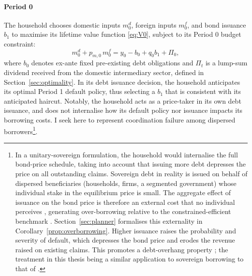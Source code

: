 \documentclass[11pt]{article}
\theoremstyle{definition}
\theoremstyle{plain}
\theoremstyle{remark}
\newcommand{\mf}{m^{f}}
\newcommand{\md}{m^{d}}
\begin{document}
\paragraph{Period 0} The household chooses domestic inputs $\md_0$, foreign inputs $\mf_0$, and bond issuance $b_1$ to maximise its lifetime value function \eqref{eq:V0}, subject to its Period 0 budget constraint:
\begin{equation}\label{eq:bc0}
\md_0 + p_{m,0}\,\mf_0 = y_0 - b_0 + q_0 b_1 + \Pi_0,
\end{equation}
where $b_0$ denotes ex-ante fixed pre-existing debt obligations and $\Pi_t$ is a lump-sum dividend received from the domestic intermediary sector, defined in Section~\ref{sec:optimality}. In its debt issuance decision, the household anticipates its optimal Period 1 default policy, thus selecting a $b_1$ that is consistent with its anticipated haircut. Notably, the household acts as a price-taker in its own debt issuance, and does not internalise how its default policy nor issuance impacts its borrowing costs. I seek here to represent coordination failure among dispersed borrowers\footnote{In a unitary-sovereign formulation, the household would internalise the full bond-price schedule, taking into account that issuing more debt depresses the price on all outstanding claims. Sovereign debt in reality is issued on behalf of dispersed beneficiaries (households, firms, a segmented government) whose individual stake in the equilibrium price is small. The aggregate effect of issuance on the bond price is therefore an external cost that no individual perceives \citep{bianchi_overborrowing_2011}, generating over-borrowing relative to the constrained-efficient benchmark \citep{aguiar_economics_2021}. Section~\ref{sec:planner} formalises this externality in Corollary~\ref{prop:overborrowing}. Higher issuance raises the probability and severity of default, which depresses the bond price and erodes the revenue raised on existing claims. This promotes a debt-overhang property \citep{myers_determinants_1977}; the treatment in this thesis being a similar application to sovereign borrowing to that of \citet{goodhart_debt_2018}.}. 
\end{document}
